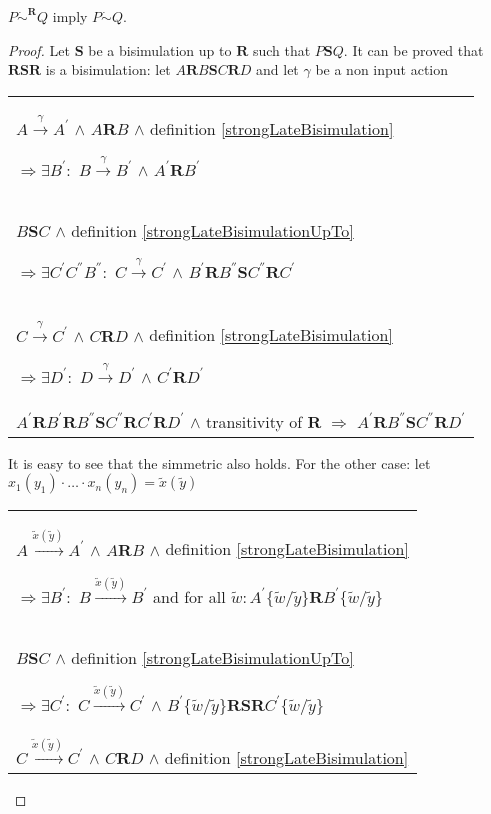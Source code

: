 \begin{proposition}
  $P \dot{\sim}^{\mathbf{R}} Q$ imply $P \dot{\sim} Q$.
   \begin{proof}
     Let $\mathbf{S}$ be a bisimulation up to $\mathbf{R}$ such that $P \mathbf{S} Q$. It can be proved that $\mathbf{R} \mathbf{S} \mathbf{R}$ is a bisimulation: let $A \mathbf{R} B \mathbf{S} C \mathbf{R} D$ and let $\gamma$ be a non input action
     \begin{center}
       \begin{tabular}{l}
 	$A \xrightarrow{\gamma} A^{'}$ $\wedge$ $A \mathbf{R} B$ $\wedge$ definition \ref{strongLateBisimulation}
       
 	$\Rightarrow \exists B^{'}:$ $B \xrightarrow{\gamma} B^{'}$ $\wedge$ $A^{'} \mathbf{R} B^{'}$
       \\
 	$B \mathbf{S} C$ $\wedge$ definition \ref{strongLateBisimulationUpTo}
       
 	$\Rightarrow \exists C^{'} C^{''} B^{''}:$ $C \xrightarrow{\gamma} C^{'}$ $\wedge$ $B^{'} \mathbf{R} B^{''} \mathbf{S} C^{''} \mathbf{R} C^{'}$
       \\
 	$C \xrightarrow{\gamma} C^{'}$ $\wedge$ $C \mathbf{R} D$ $\wedge$ definition \ref{strongLateBisimulation} 
       
	$\Rightarrow \exists D^{'}:$ $D \xrightarrow{\gamma} D^{'}$ $\wedge$ $C^{'}\mathbf{R} D^{'}$
       \\
	$A^{'} \mathbf{R} B^{'} \mathbf{R} B^{''} \mathbf{S} C^{''} \mathbf{R} C^{'} \mathbf{R} D^{'}$ $\wedge$ transitivity of $\mathbf{R}$
	$\Rightarrow$ $A^{'} \mathbf{R} B^{''} \mathbf{S} C^{''} \mathbf{R} D^{'}$
      \end{tabular}
    \end{center}
    It is easy to see that the simmetric also holds. For the other case: let $x_{1}(y_{1}) \cdot \ldots \cdot x_{n}(y_{n})= \tilde{x}(\tilde{y})$
     \begin{center}
       \begin{tabular}{l}
 	$A \xrightarrow{\tilde{x}(\tilde{y})} A^{'}$ $\wedge$ $A \mathbf{R} B$ $\wedge$ definition \ref{strongLateBisimulation}
       
 	$\Rightarrow \exists B^{'}:$ $B \xrightarrow{\tilde{x}(\tilde{y})} B^{'}$ and for all $\tilde{w}:A^{'}\{\tilde{w}/\tilde{y}\} \mathbf{R} B^{'}\{\tilde{w}/\tilde{y}\}$
       \\
 	$B \mathbf{S} C$ $\wedge$ definition \ref{strongLateBisimulationUpTo}
       
 	$\Rightarrow \exists C^{'}:$ $C \xrightarrow{\tilde{x}(\tilde{y})} C^{'}$ $\wedge$ $B^{'}\{\tilde{w}/\tilde{y}\} \mathbf{R} \mathbf{S} \mathbf{R} C^{'}\{\tilde{w}/\tilde{y}\}$
       \\
 	$C \xrightarrow{\tilde{x}(\tilde{y})} C^{'}$ $\wedge$ $C \mathbf{R} D$ $\wedge$ definition \ref{strongLateBisimulation} 
       

\end{tabular}
\end{center}
\end{proof}
\end{proposition}
